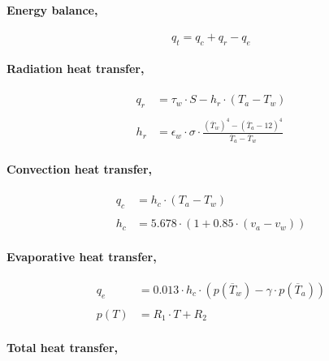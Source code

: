 \documentclass[11pt]{article}
\begin{document}
\hypertarget{energy-balance}{%
\paragraph{Energy balance,}\label{energy-balance}}

\[ q_t = q_c + q_r - q_e \]

\hypertarget{radiation-heat-transfer}{%
\paragraph{Radiation heat transfer,}\label{radiation-heat-transfer}}

\begin{align*}
  q_r &= \tau_w\cdot S - h_r \cdot (T_a - T_w) \\
\\
  h_r &= \epsilon_w\cdot \sigma\cdot \frac{(\overline T_w)^4 - (\overline T_a - 12)^4}{\overline T_a - \overline T_w}
\end{align*}

\hypertarget{convection-heat-transfer}{%
\paragraph{Convection heat transfer,}\label{convection-heat-transfer}}

\begin{align*}
  q_c &= h_c\cdot (T_a - T_w) \\
\\
  h_c &= 5.678 \cdot (1 + 0.85\cdot(v_a - v_w))
\end{align*}

\hypertarget{evaporative-heat-transfer}{%
\paragraph{Evaporative heat transfer,}\label{evaporative-heat-transfer}}

\begin{align*}
  q_e &= 0.013\cdot h_c\cdot (p(\overline T_w) - \gamma\cdot p(\overline T_a)) \\
\\
  p(T) &= R_1\cdot T + R_2
\end{align*}

\hypertarget{total-heat-transfer}{%
\paragraph{Total heat transfer,}\label{total-heat-transfer}}
\end{document}
